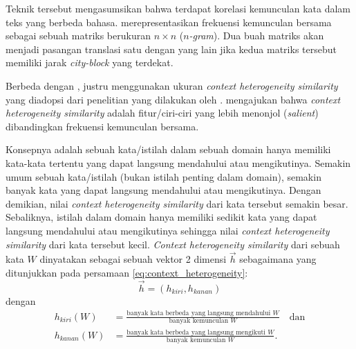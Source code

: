 \documentclass[../main/main.tex]{subfiles}
\begin{document}
Teknik tersebut mengasumsikan bahwa terdapat korelasi kemunculan kata dalam teks yang berbeda bahasa. \textcite{rapp} merepresentasikan frekuensi kemunculan bersama sebagai sebuah matriks berukuran $n \times n$ (\textit{$n$-gram}). Dua buah matriks akan menjadi pasangan translasi satu dengan yang lain jika kedua matriks tersebut memiliki jarak \textit{city-block} yang terdekat.

Berbeda dengan \textcite{rapp}, \textcite{yu} justru menggunakan ukuran \textit{context heterogeneity similarity} yang diadopsi dari penelitian yang dilakukan oleh \textcite{fung}. \textcite{fung} mengajukan bahwa \textit{context heterogeneity similarity} adalah fitur/ciri-ciri yang lebih menonjol (\textit{salient}) dibandingkan frekuensi kemunculan bersama.

Konsepnya adalah sebuah kata/istilah dalam sebuah domain hanya memiliki kata-kata tertentu yang dapat langsung mendahului atau mengikutinya. Semakin umum sebuah kata/istilah (bukan istilah penting dalam domain), semakin banyak kata yang dapat langsung mendahului atau mengikutinya. Dengan demikian, nilai \textit{context heterogeneity similarity} dari kata tersebut semakin besar. Sebaliknya, istilah dalam domain hanya memiliki sedikit kata yang dapat langsung mendahului atau mengikutinya sehingga nilai \textit{context heterogeneity similarity} dari kata tersebut kecil. \textit{Context heterogeneity similarity} dari sebuah kata $W$ dinyatakan sebagai sebuah vektor 2 dimensi $\vec{h}$ sebagaimana yang ditunjukkan pada persamaan \ref{eq:context_heterogeneity}:
\begin{equation} \label{eq:context_heterogeneity}
\vec{h} = (h_{kiri}, h_{kanan})
\end{equation}
dengan
\[
\begin{aligned}
	h_{kiri}(W) &= \frac{\text{banyak kata berbeda yang langsung mendahului $W$}}{\text{banyak kemunculan $W$}} \quad \text{dan}\\
	h_{kanan}(W) &= \frac{\text{banyak kata berbeda yang langsung mengikuti $W$}}{\text{banyak kemunculan $W$}}.
\end{aligned}
\]
\end{document}

